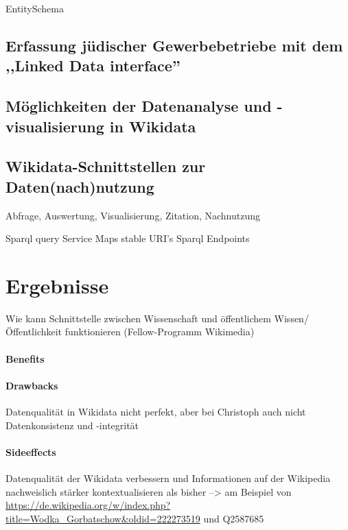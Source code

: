 EntitySchema 
\subsection{Erfassung jüdischer Gewerbebetriebe mit dem ,,Linked Data interface''}

\subsection{Möglichkeiten der Datenanalyse und -visualisierung in Wikidata}

\subsection{Wikidata-Schnittstellen zur Daten(nach)nutzung}

Abfrage, Auswertung, Visualisierung, Zitation, Nachnutzung

Sparql query Service
Maps
stable URI's
Sparql Endpoints

\section{Ergebnisse}

Wie kann Schnittstelle zwischen Wissenschaft und öffentlichem Wissen/ Öffentlichkeit funktionieren (Fellow-Programm Wikimedia)

\paragraph{Benefits}

\paragraph{Drawbacks}

Datenqualität in Wikidata nicht perfekt, aber bei Christoph auch nicht
Datenkonsistenz und -integrität

\paragraph{Sideeffects}

Datenqualität der Wikidata verbessern und Informationen auf der Wikipedia nachweislich stärker kontextualisieren als bisher
--> am Beispiel von \url{https://de.wikipedia.org/w/index.php?title=Wodka_Gorbatschow&oldid=222273519} und Q2587685